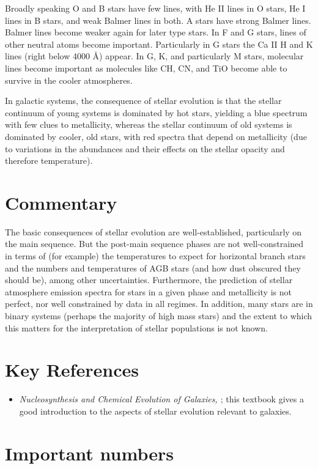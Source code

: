 Broadly speaking O and B stars have few lines, with He II lines in O
stars, He I lines in B stars, and weak Balmer lines in both. A stars
have strong Balmer lines. Balmer lines become weaker again for later
type stars. In F and G stars, lines of other neutral atoms become
important. Particularly in G stars the Ca II H and K lines (right
below 4000 \AA) appear. In G, K, and particularly M stars, molecular
lines become important as molecules like CH, CN, and TiO become able
to survive in the cooler atmospheres.

In galactic systems, the consequence of stellar evolution is that the
stellar continuum of young systems is dominated by hot stars, yielding
a blue spectrum with few clues to metallicity, whereas the stellar
continuum of old systems is dominated by cooler, old stars, with red
spectra that depend on metallicity (due to variations in the
abundances and their effects on the stellar opacity and therefore
temperature). 

\section{Commentary}

The basic consequences of stellar evolution are well-established,
particularly on the main sequence. But the post-main sequence phases
are not well-constrained in terms of (for example) the temperatures to
expect for horizontal branch stars and the numbers and temperatures of
AGB stars (and how dust obscured they should be), among other
uncertainties. Furthermore, the prediction of stellar atmosphere
emission spectra for stars in a given phase and metallicity is not
perfect, nor well constrained by data in all regimes. In addition,
many stars are in binary systems (perhaps the majority of high mass
stars) and the extent to which this matters for the interpretation of
stellar populations is not known.

\section{Key References}

\begin{itemize}
  \item {\it Nucleosynthesis and Chemical Evolution of
  Galaxies, \citet{pagel09a}}; this textbook gives a good introduction
  to the aspects of stellar evolution relevant to galaxies.
\end{itemize}

\section{Important numbers}

